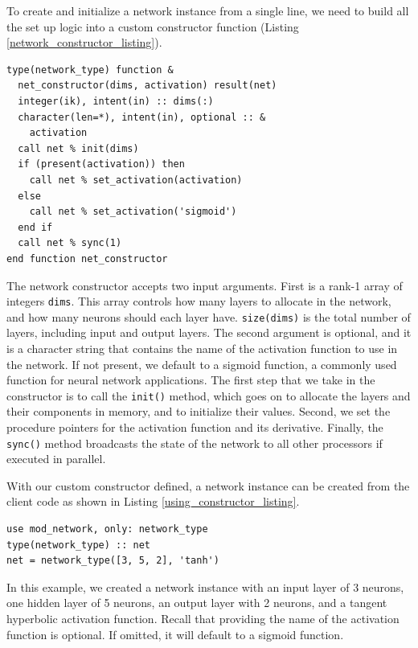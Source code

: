 \documentclass[sigplan, review=false, screen=true, balance=true]{acmart}
\begin{document}
To create and initialize a network instance from a single line, we need to
build all the set up logic into a custom constructor function (Listing
\ref{network_constructor_listing}).

\begin{lstlisting}[caption={Custom network constructor.}, captionpos=b, label={network_constructor_listing}]
type(network_type) function &
  net_constructor(dims, activation) result(net)
  integer(ik), intent(in) :: dims(:)
  character(len=*), intent(in), optional :: &
    activation
  call net % init(dims)
  if (present(activation)) then
    call net % set_activation(activation)
  else
    call net % set_activation('sigmoid')
  end if
  call net % sync(1)
end function net_constructor
\end{lstlisting}

The network constructor accepts two input arguments. First is a rank-1 array of
integers \lstinline{dims}. This array controls how many layers to allocate in
the network, and how many neurons should each layer have. \lstinline{size(dims)}
is the total number of layers, including input and output layers. The second
argument is optional, and it is a character string that contains the name of the
activation function to use in the network. If not present, we default to a
sigmoid function, a commonly used function for neural network applications.
The first step that we take in the constructor is to call the \lstinline{init()} method,
which goes on to allocate the layers and their components in memory, and to
initialize their values. Second, we set the procedure pointers for the activation
function and its derivative. Finally, the \lstinline{sync()} method broadcasts
the state of the network to all other processors if executed in parallel.

With our custom constructor defined, a network instance can be created from the
client code as shown in Listing \ref{using_constructor_listing}.

\begin{lstlisting}[caption={Creating a network instance in the client code.}, captionpos=b, label={using_constructor_listing}]
use mod_network, only: network_type
type(network_type) :: net
net = network_type([3, 5, 2], 'tanh')
\end{lstlisting}

In this example, we created a network instance with an input layer of 3 neurons,
one hidden layer of 5 neurons, an output layer with 2 neurons, and a tangent
hyperbolic activation function. Recall that providing the name of the activation
function is optional. If omitted, it will default to a sigmoid function.
\end{document}
